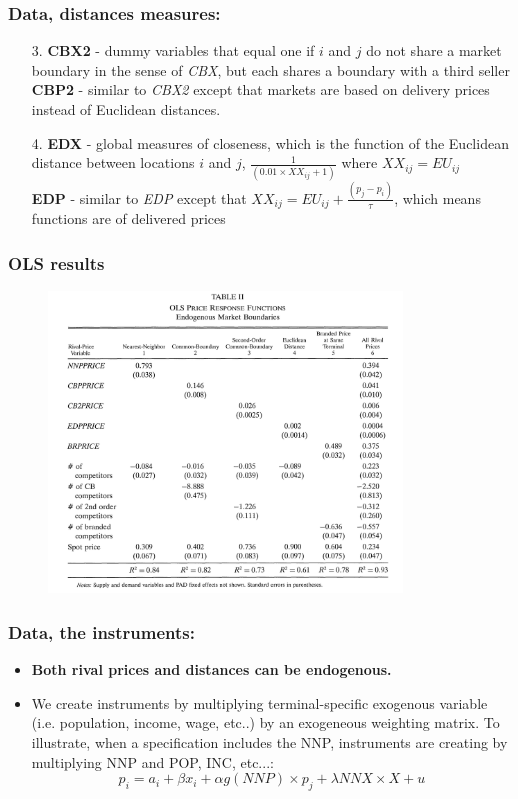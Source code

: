 \documentclass{beamer}
\begin{document}
\begin{frame}
  \frametitle{Data, distances measures:}
  \begin{itemize}
    \item[3.] \textbf{CBX2} - dummy variables that equal one if $i$ and $j$ do not share a market boundary in the sense of \textit{CBX}, but each shares a boundary with a third seller \\
      \textbf{CBP2} - similar to \textit{CBX2} except that markets are based on delivery prices instead of Euclidean distances. 
    \item[4.] \textbf{EDX} - global measures of closeness, which is the function of the Euclidean distance between locations $i$ and $j$, $\frac{1}{(0.01 \times XX_{ij} + 1)}$ where $XX_{ij} = EU_{ij}$ \\
      \textbf{EDP} - similar to \textit{EDP} except that $XX_{ij} = EU_{ij} + \frac{(p_j - p_i)}{\tau}$, which means functions are of delivered prices
  \end{itemize}
\end{frame} 

\begin{frame}
  \frametitle{OLS results}
  \vspace{-0.5cm}
  \begin{figure}
    \includegraphics[width=\linewidth, height= 8cm]{OLS_res.png}
  \end{figure}
\end{frame}

\begin{frame}
  \frametitle{Data, the instruments:}
  \begin{itemize}
    \item \textbf{Both rival prices and distances can be endogenous.}
    \item We create instruments by multiplying terminal-specific exogenous variable (i.e. population, income, wage, etc..) by an exogeneous weighting matrix. To illustrate, when a specification includes the NNP, instruments are creating by multiplying NNP and POP, INC, etc...:
      \[p_i = a_i + \beta x_i + \alpha g(NNP) \times p_j + \lambda NNX \times X + u \]
  \end{itemize}
\end{frame}
\end{document}
